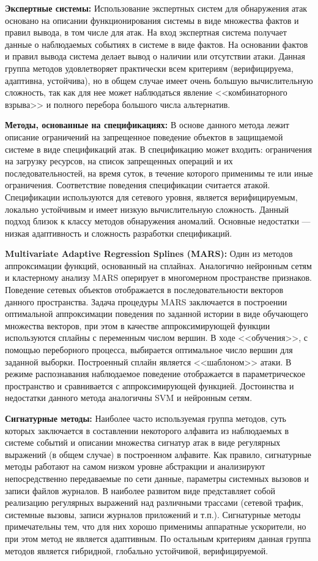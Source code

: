 \textbf{Экспертные системы:} Использование экспертных систем для обнаружения атак основано на описании функционирования системы в виде множества фактов и правил вывода, в том числе для атак. На вход экспертная система получает данные о наблюдаемых событиях в системе в виде фактов. На основании фактов и правил вывода система делает вывод о наличии или отсутствии атаки. Данная группа методов удовлетворяет практически всем критериям (верифицируема, адаптивна, устойчива), но в общем случае имеет очень большую вычислительную сложность, так как для нее может наблюдаться явление <<комбинаторного взрыва>> и полного перебора большого числа альтернатив.

\textbf{Методы, основанные на спецификациях:} В основе данного метода лежит описание ограничений на запрещенное поведение объектов в защищаемой системе в виде спецификаций атак. В спецификацию может входить: ограничения на загрузку ресурсов, на список запрещенных операций и их последовательностей, на время суток, в течение которого применимы те или иные ограничения. Соответствие поведения спецификации считается атакой. Спецификации используются для сетевого уровня, является верифицируемым, локально устойчивым и имеет низкую вычислительную сложность. Данный подход близок к классу методов обнаружения аномалий. Основные недостатки --- низкая адаптивность и сложность разработки спецификаций.

\textbf{Multivariate Adaptive Regression Splines (MARS):} Один из методов аппроксимации функций, основанный на сплайнах. Аналогично нейронным сетям и кластерному анализу MARS оперирует в многомерном пространстве признаков. Поведение сетевых объектов отображается в последовательности векторов данного пространства. Задача процедуры MARS заключается в построении оптимальной аппроксимации поведения по заданной истории в виде обучающего множества векторов, при этом в качестве аппроксимирующей функции используются сплайны с переменным числом вершин. В ходе <<обучения>>, с помощью переборного процесса, выбирается оптимальное число вершин для заданной выборки. Построенный сплайн является <<шаблоном>> атаки. В режиме распознавания наблюдаемое поведение отображается в параметрическое пространство и сравнивается с аппроксимирующей функцией. Достоинства и недостатки данного метода аналогичны SVM и нейронным сетям.

\textbf{Сигнатурные методы:} Наиболее часто используемая группа методов, суть которых заключается в составлении некоторого алфавита из наблюдаемых в системе событий и описании множества сигнатур атак в виде регулярных выражений (в общем случае) в построенном алфавите. Как правило, сигнатурные методы работают на самом низком уровне абстракции и анализируют непосредственно передаваемые по сети данные, параметры системных вызовов и записи файлов журналов. В наиболее развитом виде представляет собой реализацию регулярных выражений над различными трассами (сетевой трафик, системные вызовы, записи журналов приложений и т.п.). Сигнатурные методы примечательны тем, что для них хорошо применимы аппаратные ускорители, но при этом метод не является адаптивным. По остальным критериям данная группа методов является гибридной, глобально устойчивой, верифицируемой. 

